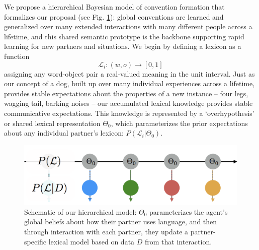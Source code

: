 \documentclass[12pt, donotrepeattitle, man, floatsintext]{apa6}
\begin{document}
We propose a hierarchical Bayesian model of convention formation that formalizes our proposal (see Fig. \ref{fig:modelschematic}): global conventions are learned and generalized over many extended interactions with many different people across a lifetime, and  this shared semantic prototype is the backbone supporting rapid learning for new partners and situations. We begin by defining a lexicon as a function $$\mathcal{L}_i: (w, o) \rightarrow [0,1]$$ assigning any word-object pair a real-valued meaning in the unit interval. Just as our concept of a dog, built up over many individual experiences across a lifetime, provides stable expectations about the properties of a new instance -- four legs, wagging tail, barking noises -- our accumulated lexical knowledge provides stable communicative expectations. 
This knowledge is represented by a `overhypothesis' or shared lexical representation $\Theta_0$, which parameterizes the prior expectations about any individual partner's lexicon: $P(\mathcal{L}_i | \Theta_0)$. 

\begin{figure}[b]
\centering
\includegraphics[scale=.4]{model_schematic.png}
\caption{Schematic of our hierarchical model: $\Theta_0$ parameterizes the agent's global beliefs about how their partner uses language, and then through interaction with each partner, they update a partner-specific lexical model based on data $D$ from that interaction.}
\label{fig:modelschematic}
\end{figure}
\end{document}

